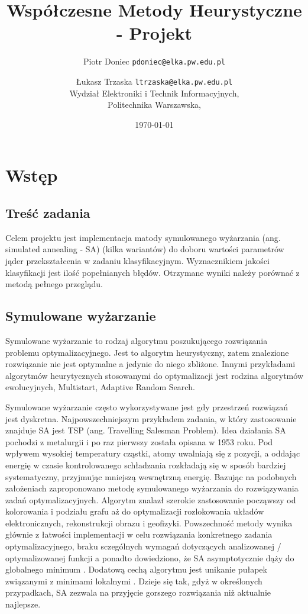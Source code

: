 \documentclass{article}
\begin{document}
\title{Współczesne Metody Heurystyczne - Projekt}
\author{
    Piotr Doniec \texttt{pdoniec@elka.pw.edu.pl}
    \and
    Łukasz Trzaska \texttt{ltrzaska@elka.pw.edu.pl}\\
    Wydział Elektroniki i Technik Informacyjnych,\\
    Politechnika Warszawska,\\
}

\date{\today}
\maketitle

\section{Wstęp}
\subsection{Treść zadania}
Celem projektu jest implementacja matody symulowanego wyżarzania (ang. simulated annealing - SA) (kilka wariantów) do doboru wartości parametrów jąder przekształcenia w zadaniu klasyfikacyjnym. Wyznacznikiem jakości klasyfikacji jest ilość popełnianych błędów. Otrzymane wyniki należy porównać z metodą pełnego przeglądu.

\subsection{Symulowane wyżarzanie}
Symulowane wyżarzanie to rodzaj algorytmu poszukującego rozwiązania problemu optymalizacyjnego. Jest to algorytm heurystyczny, zatem znalezione rozwiązanie nie jest optymalne a jedynie do niego zbliżone. Innymi przykładami algorytmów heurytycznych stosowanymi do optymalizacji jest rodzina algorytmów ewolucyjnych, Multistart, Adaptive Random Search.

Symulowane wyżarzanie często wykorzystywane jest gdy przestrzeń rozwiązań jest dyskretna. Najpowszechniejszym przykładem zadania, w który zastosowanie znajduje SA jest TSP (ang. Travelling Salesman Problem). Idea działania SA pochodzi z metalurgii i po raz pierwszy została opisana w 1953 roku. Pod wpływem wysokiej temperatury cząstki, atomy uwalniają się z pozycji, a oddając energię w czasie kontrolowanego schładzania rozkładają się w sposób bardziej systematyczny, przyjmując mniejszą wewnętrzną energię. Bazując na podobnych założeniach zaproponowano metodę symulowanego wyżarzania do rozwiązywania zadań optymalizacyjnych. 
Algorytm znalazł szerokie zastosowanie począwszy od kolorowania i podziału grafu aż do optymalizacji rozlokowania układów elektronicznych, rekonstrukcji obrazu i geofizyki. Powszechność metody wynika głównie z łatwości implementacji w celu rozwiązania konkretnego zadania optymalizacyjnego, braku sczególnych wymagań dotyczących analizowanej / optymalizowanej funkcji a ponadto dowiedziono, że SA asymptotycznie dąży do globalnego minimum \cite{varts00}. Dodatową cechą algorytmu jest unikanie pułapek związanymi z minimami lokalnymi . Dzieje się tak, gdyż w określonych przypadkach, SA zezwala na przyjęcie gorszego rozwiązania niż aktualnie najlepsze.
\end{document}
